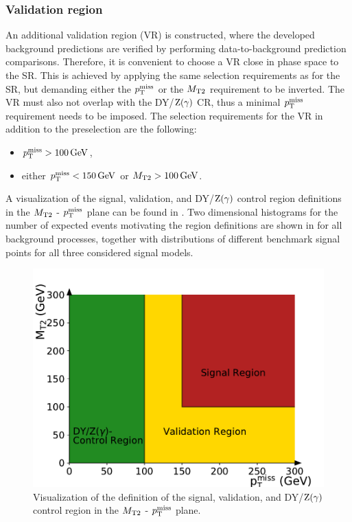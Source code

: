\subsubsection{Validation region}
An additional validation region (VR) is constructed, where the developed background predictions are verified by performing data-to-background prediction comparisons. Therefore, it is convenient to choose a VR close in phase space to the SR. This is achieved by applying the same selection requirements as for the SR, but demanding either the $p_{\mathrm{T}}^\text{miss}$ or the $M_{\mathrm{T2}}$ requirement to be inverted. The VR must also not overlap with the DY/$\mathrm{Z}(\gamma)$ CR, thus a minimal $p_{\mathrm{T}}^\text{miss}$ requirement needs to be imposed. The selection requirements for the VR in addition to the preselection are the following:
\begin{itemize}
 \item $p_{\mathrm{T}}^\text{miss}>100\,\text{Ge\hspace{-.08em}V}$,
 \item either $p_{\mathrm{T}}^\text{miss}<150\,\text{Ge\hspace{-.08em}V}$ or $M_{\mathrm{T2}}>100\,\text{Ge\hspace{-.08em}V}$.
\end{itemize}
A visualization of the signal, validation, and DY/$\mathrm{Z}(\gamma)$ control region definitions in the $M_{\mathrm{T2}}$ - $p_{\mathrm{T}}^\text{miss}$ plane can be found in . Two dimensional histograms for the number of expected events motivating the region definitions are shown in  for all background processes, together with distributions of different benchmark signal points for all three considered signal models.
\begin{figure}[tbp]
 \centering
 \includegraphics[width=\pairwidth]{figures/figures/regions}
 \caption{Visualization of the definition of the signal, validation, and DY/$\mathrm{Z}(\gamma)$ control region in the $M_{\mathrm{T2}}$ - $p_{\mathrm{T}}^\text{miss}$ plane.}
 \label{fig:Regions}
\end{figure}
